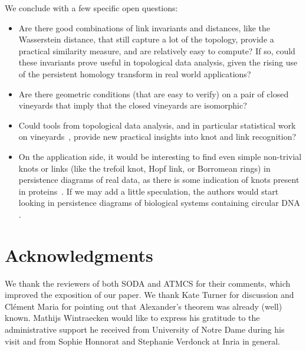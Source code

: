 \documentclass[twoside,leqno]{article}
\begin{document}
We conclude with a few specific open questions:
\begin{itemize}
\item[-] Are there good combinations of link invariants and distances, like the Wasserstein distance, that still capture a lot of the topology, provide a practical similarity measure, and are relatively easy to compute?  If so, could these invariants prove useful in topological data analysis, given the rising use of the persistent homology transform in real world applications?
\item[-] Are there geometric conditions (that are easy to verify) on a pair of closed vineyards that imply that the closed vineyards are isomorphic?
\item[-] Could tools from topological data analysis, and in particular statistical work on vineyards~\cite{Munch2015}, provide new practical insights into knot and link recognition?
\item[-] On the application side, it would be interesting to find even simple non-trivial knots or links (like the trefoil knot, Hopf link, or  Borromean rings) in persistence diagrams of real data, as there is some indication of knots present in proteins~\cite{Letscher2012}. If we may add a little speculation, the authors would start looking in persistence diagrams of biological systems containing circular DNA \cite{neill2024enzymatic}.  
\end{itemize} 









%
%
%
%
%
    
%
%
%


%
%
%


%
%
%
%
%
%
%

%


\section*{Acknowledgments}
We thank the reviewers of both SODA and ATMCS for their comments, which improved the exposition of our paper. 
We thank Kate Turner for discussion and Cl{\'e}ment Maria for pointing out that Alexander's theorem was already (well) known. 
Mathijs Wintraecken would like to express his gratitude to the administrative support he received from University of Notre Dame  during his visit and from Sophie Honnorat and Stephanie Verdonck at Inria in general. 
\end{document}
